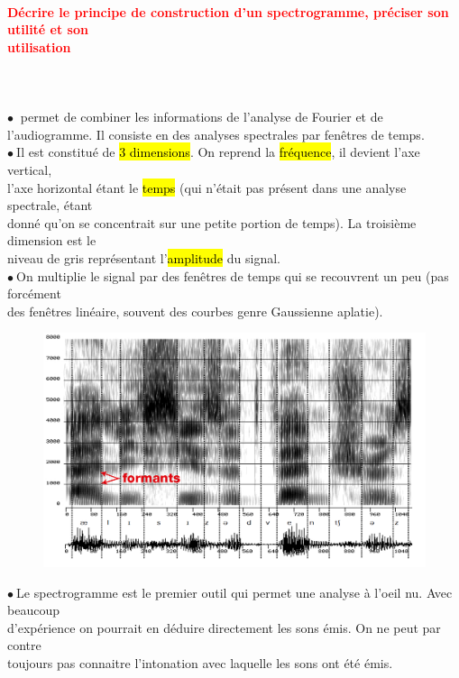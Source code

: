 \documentclass[letterpaper, 12pt]{article}
\newcommand{\alinea}{
\hspace*{0.3cm}}
\newcommand{\red}[1]{
	\textcolor{red}{#1}
}
\newcommand{\myul}[1]{
	\underline{\smash{#1}}
}
\newcommand{\point}{$\bullet\ $}
\begin{document}
		\paragraph{\red{Décrire le principe de construction d'un spectrogramme, préciser son utilité et son 		
		~\\ \hspace*{0.035cm} utilisation}}~\\~\\
			\point \myul{Un spectrogramme} permet de combiner les informations de l'analyse de Fourier et
			de \\\alinea l'audiogramme. Il consiste en des analyses spectrales par fenêtres de temps.\\
			\point Il est constitué de \hl{3 dimensions}. On reprend la \hl{fr\'equence}, il devient l'axe vertical,
			\\\alinea l'axe horizontal étant le \hl{temps} (qui n'était pas présent dans une analyse spectrale, 
			étant  \\\alinea donné qu'on se concentrait sur une petite portion de temps). La troisième dimension
			est le \\\alinea niveau de gris représentant l'\hl{amplitude} du signal.\\
			\point On multiplie le signal par des fenêtres de temps qui se recouvrent un peu (pas forcément
				\\\alinea des fenêtres linéaire, souvent des courbes genre Gaussienne aplatie).	
			\begin{figure}[H]
				\centering
				\includegraphics[scale=0.33]{Images/spectrogram}
			\end{figure}\noindent
			\point Le spectrogramme est le premier outil qui permet une analyse à l'oeil nu. Avec beaucoup 	
			\\\alinea d'expérience on pourrait en déduire directement les sons émis. On ne peut par contre 
			\\\alinea toujours pas connaitre l'intonation avec laquelle les sons ont été émis.
			
\end{document}
